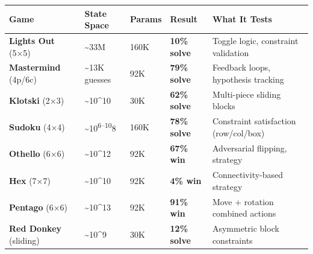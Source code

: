 \documentclass[
]{article}
\begin{document}
\begin{longtable}[]{@{}
  >{\raggedright\arraybackslash}p{}
  >{\raggedright\arraybackslash}p{}
  >{\raggedleft\arraybackslash}p{}
  >{\raggedleft\arraybackslash}p{}
  >{\raggedright\arraybackslash}p{}@{}}
\toprule\noalign{}
\begin{minipage}[b]{\linewidth}\raggedright
Game
\end{minipage} & \begin{minipage}[b]{\linewidth}\raggedright
State Space
\end{minipage} & \begin{minipage}[b]{\linewidth}\raggedleft
Params
\end{minipage} & \begin{minipage}[b]{\linewidth}\raggedleft
Result
\end{minipage} & \begin{minipage}[b]{\linewidth}\raggedright
What It Tests
\end{minipage} \\
\midrule\noalign{}
\endhead
\bottomrule\noalign{}
\endlastfoot
\textbf{Lights Out} (5×5) & \textasciitilde33M & 160K & \textbf{10\%
solve} & Toggle logic, constraint validation \\
\textbf{Mastermind} (4p/6c) & \textasciitilde13K guesses & 92K &
\textbf{79\% solve} & Feedback loops, hypothesis tracking \\
\textbf{Klotski} (2×3) & \textasciitilde10\^{}10 & 30K & \textbf{62\%
solve} & Multi-piece sliding blocks \\
\textbf{Sudoku} (4×4) & \textasciitilde10\textsuperscript{6--10}8 & 160K
& \textbf{78\% solve} & Constraint satisfaction (row/col/box) \\
\textbf{Othello} (6×6) & \textasciitilde10\^{}12 & 92K & \textbf{67\%
win} & Adversarial flipping, strategy \\
\textbf{Hex} (7×7) & \textasciitilde10\^{}10 & 92K & \textbf{4\% win} &
Connectivity-based strategy \\
\textbf{Pentago} (6×6) & \textasciitilde10\^{}13 & 92K & \textbf{91\%
win} & Move + rotation combined actions \\
\textbf{Red Donkey} (sliding) & \textasciitilde10\^{}9 & 30K &
\textbf{12\% solve} & Asymmetric block constraints \\
\end{longtable}
\end{document}
